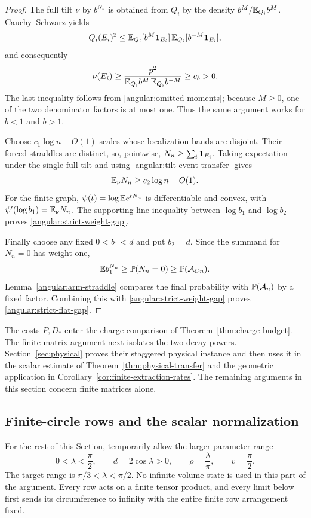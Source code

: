 \begin{proof}
The full tilt \(\nu\) by \(b^{N_n}\) is obtained from
\(Q_i\) by the density
\(b^M/\mathbb E_{Q_i}b^M\).  Cauchy--Schwarz yields
\[
 Q_i(E_i)^2
 \le \mathbb E_{Q_i}[b^M\mathbf 1_{E_i}]\,
       \mathbb E_{Q_i}[b^{-M}\mathbf 1_{E_i}],
\]
and consequently
\begin{equation}\label{angular:tilt-event-transfer}
 \nu(E_i)\ge
 \frac{p^2}
      {\mathbb E_{Q_i}b^M\,\mathbb E_{Q_i}b^{-M}}
 \ge c_b>0 .
\end{equation}
The last inequality follows from
\eqref{angular:omitted-moments}; because \(M\ge0\),
one of the two denominator factors is at most one.
Thus the same argument works for \(b<1\) and \(b>1\).

Choose \(c_1\log n-O(1)\) scales whose localization
bands are disjoint.  Their forced straddles are distinct,
so, pointwise,
\(N_n\ge\sum_i\mathbf 1_{E_i}\).  Taking expectation under
the single full tilt and using
\eqref{angular:tilt-event-transfer} gives
\[
 \mathbb E_{\nu}N_n\ge c_2\log n-O(1).
\]
For the finite graph,
\(\psi(t)=\log\mathbb E e^{tN_n}\) is differentiable and
convex, with
\(\psi'(\log b_1)=\mathbb E_{\nu}N_n\).
The supporting-line inequality between
\(\log b_1\) and \(\log b_2\) proves
\eqref{angular:strict-weight-gap}.

Finally choose any fixed \(0<b_1<d\) and put \(b_2=d\).
Since the summand for \(N_n=0\) has weight one,
\[
 \mathbb E b_1^{N_n}\ge\mathbb P(N_n=0)
       \ge\mathbb P(\mathcal A_{Cn}).
\]
Lemma~\ref{angular:arm-straddle} compares the final
probability with \(\mathbb P(\mathcal A_n)\) by a fixed factor.
Combining this with \eqref{angular:strict-weight-gap}
proves \eqref{angular:strict-flat-gap}.
\end{proof}

The costs $P,D_*$ enter the charge comparison of
Theorem~\ref{thm:charge-budget}.  The finite matrix argument next isolates
the two decay powers.  Section~\ref{sec:physical} proves their staggered
physical instance and then uses it in the scalar estimate of
Theorem~\ref{thm:physical-transfer} and the geometric application in
Corollary~\ref{cor:finite-extraction-rates}. The remaining arguments in
this section concern finite matrices alone.

\subsection{Finite-circle rows and the scalar normalization}

For the rest of this Section, temporarily allow the larger parameter range
\begin{equation}\label{angular:parameters}
 0<\lambda<\frac\pi2,\qquad d=2\cos\lambda>0,\qquad
 \rho=\frac\lambda\pi,\qquad v=\frac\pi2.
\end{equation}
The target range is $\pi/3<\lambda<\pi/2$.  No infinite-volume state is
used in this part of the argument.  Every row acts on a finite tensor
product, and every limit below first sends its circumference to infinity
with the entire finite row arrangement fixed.


